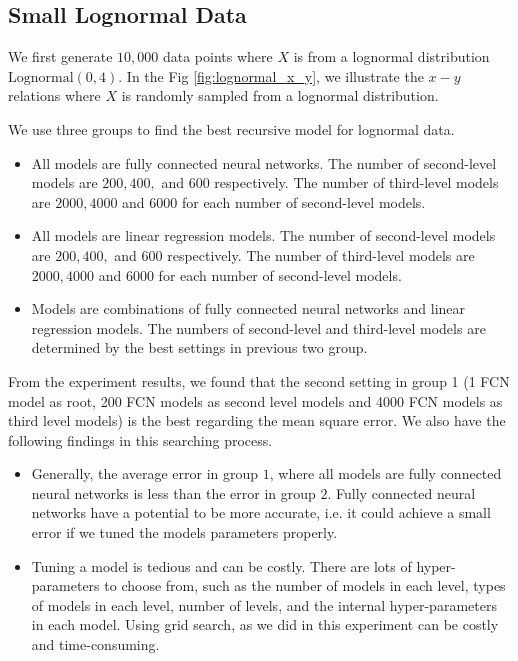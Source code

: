 \subsection{Small Lognormal Data}

We first generate $10,000$ data points where $X$ is from a lognormal distribution $\text{Lognormal}(0, 4)$. In the Fig \ref{fig:lognormal_x_y}, we illustrate the $x-y$ relations where $X$ is randomly sampled from a lognormal distribution.

We use three groups to find the best recursive model for lognormal data.
\begin{itemize}
	\item All models are fully connected neural networks. The number of second-level models are $200, 400,$ and $600$ respectively. The number of third-level models are $2000, 4000$ and $6000$ for each number of second-level models.
	\item All models are linear regression models. The number of second-level models are $200, 400,$ and $600$ respectively. The number of third-level models are $2000, 4000$ and $6000$ for each number of second-level models.
	\item Models are combinations of fully connected neural networks and linear regression models. The numbers of second-level and third-level models are determined by the best settings in previous two group.
\end{itemize}

\begin{figure}
	
\end{figure}

From the experiment results, we found that the second setting in group 1 (1 FCN model as root, 200 FCN models as second level models and 4000 FCN models as third level models) is the best regarding the mean square error. We also have the following findings in this searching process.

\begin{itemize}
	\item Generally, the average error in group $1$, where all models are fully connected neural networks is less than the error in group $2$. Fully connected neural networks have a potential to be more accurate, i.e. it could achieve a small error if we tuned the models parameters properly.
	\item Tuning a model is tedious and can be costly. There are lots of hyper-parameters to choose from, such as the number of models in each level, types of models in each level, number of levels, and the internal hyper-parameters in each model. Using grid search, as we did in this experiment can be costly and time-consuming.
\end{itemize}

